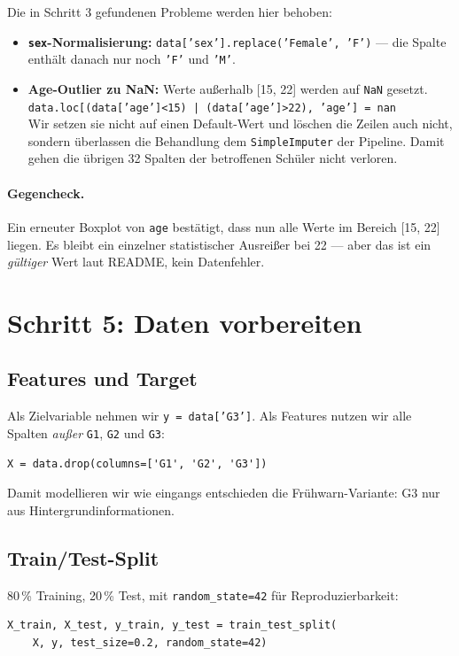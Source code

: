 \documentclass[11pt,a4paper]{article}
\begin{document}
Die in Schritt 3 gefundenen Probleme werden hier behoben:

\begin{itemize}
    \item \textbf{\texttt{sex}-Normalisierung:} \texttt{data['sex'].replace('Female', 'F')} --- die Spalte enthält danach nur noch \texttt{'F'} und \texttt{'M'}.
    \item \textbf{Age-Outlier zu NaN:} Werte außerhalb [15, 22] werden auf \texttt{NaN} gesetzt. \\
    \texttt{data.loc[(data['age']<15) | (data['age']>22), 'age'] = nan}\\
    Wir setzen sie nicht auf einen Default-Wert und löschen die Zeilen auch nicht, sondern überlassen die Behandlung dem \texttt{SimpleImputer} der Pipeline. Damit gehen die übrigen 32 Spalten der betroffenen Schüler nicht verloren.
\end{itemize}

\paragraph{Gegencheck.} Ein erneuter Boxplot von \texttt{age} bestätigt, dass nun alle Werte im Bereich [15, 22] liegen. Es bleibt ein einzelner statistischer Ausreißer bei 22 --- aber das ist ein \emph{gültiger} Wert laut README, kein Datenfehler.

\section{Schritt 5: Daten vorbereiten}

\subsection{Features und Target}
Als Zielvariable nehmen wir \texttt{y = data['G3']}. Als Features nutzen wir alle Spalten \emph{außer} \texttt{G1}, \texttt{G2} und \texttt{G3}:
\begin{verbatim}
X = data.drop(columns=['G1', 'G2', 'G3'])
\end{verbatim}
Damit modellieren wir wie eingangs entschieden die Frühwarn-Variante: G3 nur aus Hintergrundinformationen.

\subsection{Train/Test-Split}
80\,\% Training, 20\,\% Test, mit \texttt{random\_state=42} für Reproduzierbarkeit:
\begin{verbatim}
X_train, X_test, y_train, y_test = train_test_split(
    X, y, test_size=0.2, random_state=42)
\end{verbatim}
\end{document}
